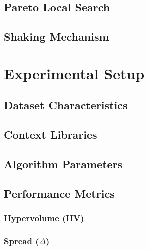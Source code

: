 \documentclass[runningheads]{llncs}
\begin{document}

\subsection{Pareto Local Search}


\subsection{Shaking Mechanism}


\section{Experimental Setup}

\subsection{Dataset Characteristics}


\subsection{Context Libraries}


\subsection{Algorithm Parameters}


\subsection{Performance Metrics}

\subsubsection{Hypervolume (HV)}


\subsubsection{Spread ($\Delta$)}
\end{document}
